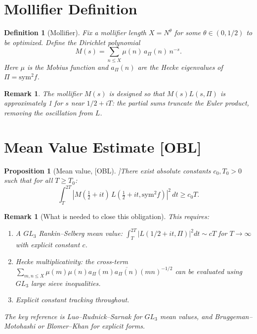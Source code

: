 \documentclass[12pt]{article}
\newtheorem{proposition}[theorem]{Proposition}
\newtheorem{definition}[theorem]{Definition}
\newtheorem{remark}[theorem]{Remark}
\begin{document}
\section{Mollifier Definition}

\begin{definition}[Mollifier]\label{def:mollifier}
Fix a mollifier length $X = N^\theta$ for some $\theta \in (0, 1/2)$ to be optimized.
Define the Dirichlet polynomial
\[
  M(s) = \sum_{n \leq X} \mu(n)\, a_\Pi(n)\, n^{-s}.
\]
Here $\mu$ is the Mobius function and $a_\Pi(n)$ are the Hecke eigenvalues of
$\Pi = \mathrm{sym}^2 f$.
\end{definition}

\begin{remark}
The mollifier $M(s)$ is designed so that $M(s) L(s, \Pi)$ is approximately 1
for $s$ near $1/2 + iT$: the partial sums truncate the Euler product, removing
the oscillation from $L$.
\end{remark}

\section{Mean Value Estimate [OBL]}

\begin{proposition}[Mean value, [OBL]]\label{prop:mean-value}
There exist absolute constants $c_0, T_0 > 0$ such that for all $T \geq T_0$:
\[
  \int_T^{2T} |M(\tfrac12+it)\, L(\tfrac12+it, \mathrm{sym}^2 f)|^2\, dt \geq c_0 T.
\]
\end{proposition}

\begin{remark}[What is needed to close this obligation]
This requires:
\begin{enumerate}
  \item A $GL_3$ Rankin--Selberg mean value: $\int_T^{2T} |L(1/2+it, \Pi)|^2 dt \sim cT$
        for $T \to \infty$ with explicit constant $c$.
  \item Hecke multiplicativity: the cross-term $\sum_{m,n \leq X} \mu(m)\mu(n)
        a_\Pi(m) \overline{a_\Pi(n)} (mn)^{-1/2}$ can be evaluated using
        $GL_3$ large sieve inequalities.
  \item Explicit constant tracking throughout.
\end{enumerate}
The key reference is Luo--Rudnick--Sarnak \cite{LRS95} for $GL_3$ mean values,
and Bruggeman--Motohashi or Blomer--Khan for explicit forms.
\end{remark}
\end{document}
